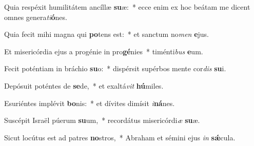 ﻿\setcounter{enumi}{2}
\item Quia respéxit humilitátem ancíllæ \textbf{su}æ:~* ecce enim ex hoc beátam me dicent omnes genera\textit{ti}\textbf{ó}nes.

\item Quia fecit mihi magna qui \textbf{po}tens est:~* et sanctum no\textit{men} \textbf{e}jus.

\item Et misericórdia ejus a progénie in pro\textbf{gé}nies~* timénti\textit{bus} \textbf{e}um.

\item Fecit poténtiam in bráchio \textbf{su}o:~* dispérsit supérbos mente cor\textit{dis} \textbf{su}i.

\item Depósuit poténtes de \textbf{se}de,~* et exaltá\textit{vit} \textbf{hú}miles.

\item Esuriéntes implévit \textbf{bo}nis:~* et dívites dimísit \textit{i}\textbf{ná}nes.

\item Suscépit Israël púerum \textbf{su}um,~* recordátus misericórdi\textit{æ} \textbf{su}æ.

\item Sicut locútus est ad patres \textbf{no}stros,~* Abraham et sémini ejus \textit{in} \textbf{sǽ}cula.